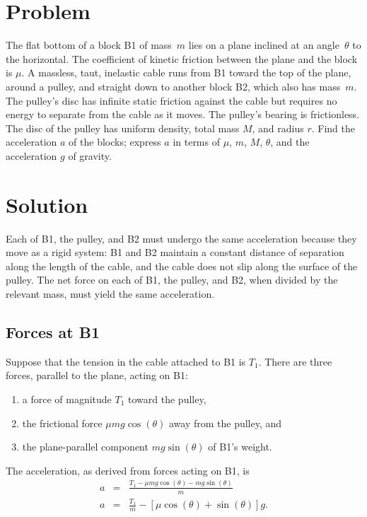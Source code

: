 \documentclass[twocolumn]{article}
\begin{document}
\section{Problem}

The flat bottom of a block B1 of mass~$m$ lies on a plane inclined at an
angle~$\theta$ to the horizontal. The coefficient of kinetic friction between
the plane and the block is $\mu$.  A massless, taut, inelastic cable runs from
B1 toward the top of the plane, around a pulley, and straight down to another
block B2, which also has mass~$m$.  The pulley's disc has infinite static
friction against the cable but requires no energy to separate from the cable as
it moves. The pulley's bearing is frictionless. The disc of the pulley has
uniform density, total mass $M$, and radius $r$. Find the acceleration $a$ of
the blocks; express $a$ in terms of $\mu$, $m$, $M$, $\theta$, and the
acceleration $g$ of gravity.

\section{Solution}

Each of B1, the pulley, and B2 must undergo the same acceleration because they
move as a rigid system: B1 and B2 maintain a constant distance of separation
along the length of the cable, and the cable does not slip along the surface of
the pulley.  The net force on each of B1, the pulley, and B2, when divided by
the relevant mass, must yield the same acceleration.

\subsection{Forces at B1}

Suppose that the tension in the cable attached to B1 is $T_1$. There are three
forces, parallel to the plane, acting on B1:
\begin{enumerate}
      \item a force of magnitude $T_1$ toward the pulley,
      \item the frictional force $\mu m g \cos(\theta)$ away from the pulley,
         and
      \item the plane-parallel component $m g \sin(\theta)$ of B1's weight.
\end{enumerate}
The acceleration, as derived from forces acting on B1, is
\begin{eqnarray}
   \nonumber
   a &=& \frac{T_1 - \mu m g \cos(\theta) - m g \sin(\theta)}{m}\\
   a &=& \frac{T_1}{m} - [\mu \cos(\theta) + \sin(\theta)] g.
   \label{eq:B1}
\end{eqnarray}
\end{document}
